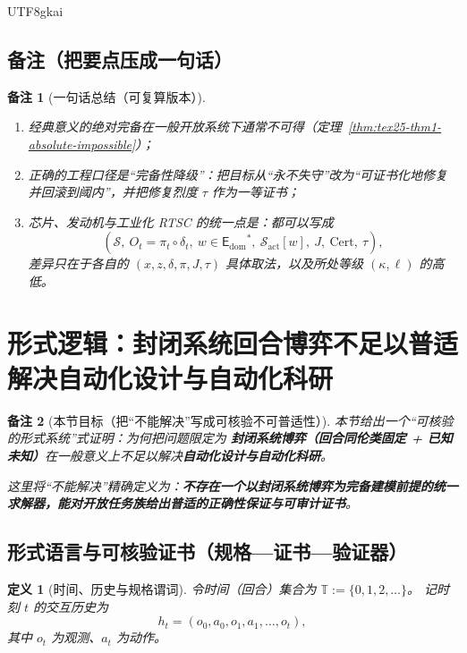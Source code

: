 \documentclass[12pt]{article}
\newtheorem{definition}{定义}[section]
\newtheorem{remark}{备注}[section]
\newcommand{\EDOM}{\ensuremath{\mathsf{E}_{\mathrm{dom}}}}
\newcommand{\Cert}{\ensuremath{\mathrm{Cert}}}
\begin{document}
\begin{CJK*}{UTF8}{gkai}
\subsection{备注（把要点压成一句话）}
\label{subsec:tex25-remark}

\begin{remark}[一句话总结（可复算版本）]
\begin{enumerate}
  \item 经典意义的绝对完备在一般开放系统下通常不可得（定理~\ref{thm:tex25-thm1-absolute-impossible}）；
  \item 正确的工程口径是“完备性降级”：把目标从“永不失守”改为“可证书化地修复并回滚到阈内”，并把修复烈度 $\tau$ 作为一等证书；
  \item 芯片、发动机与工业化 RTSC 的统一点是：都可以写成
  \[
    (\mathcal{S},\ O_t=\pi_t\circ\delta_t,\ w\in\EDOM^{\ast},\ \mathcal{S}_{\mathrm{act}}[w],\ J,\ \Cert,\ \tau),
  \]
  差异只在于各自的 $(x,z,\delta,\pi,J,\tau)$ 具体取法，以及所处等级 $(\kappa,\ell)$ 的高低。
\end{enumerate}
\end{remark}

\section{形式逻辑：封闭系统回合博弈不足以普适解决自动化设计与自动化科研}
\label{sec:tex25-closed-vs-open}

\begin{remark}[本节目标（把“不能解决”写成可核验不可普适性）]
本节给出一个“可核验的形式系统”式证明：为何把问题限定为
\textbf{封闭系统博弈（回合同伦类固定 + 已知未知）}在一般意义上不足以解决\textbf{自动化设计与自动化科研}。

这里将“不能解决”精确定义为：\textbf{不存在一个以封闭系统博弈为完备建模前提的统一求解器，能对开放任务族给出普适的正确性保证与可审计证书}。
\end{remark}

\subsection{形式语言与可核验证书（规格—证书—验证器）}
\label{subsec:tex25-lang-cert}

\begin{definition}[时间、历史与规格谓词]
令时间（回合）集合为 $\mathbb{T}:=\{0,1,2,\dots\}$。
记时刻 $t$ 的交互历史为
\[
  h_t=(o_0,a_0,o_1,a_1,\dots,o_t),
\]
其中 $o_t$ 为观测、$a_t$ 为动作。


\end{definition}
\end{CJK*}
\end{document}
